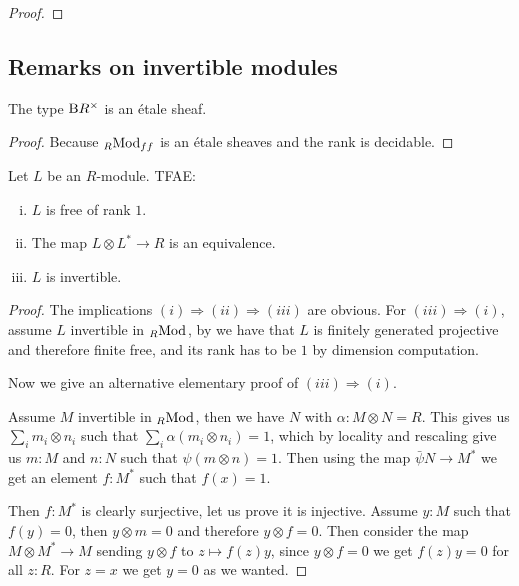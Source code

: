 \begin{proof}
\end{proof}



\subsection{Remarks on invertible modules}


\begin{lemma}
The type $\mathrm{B} R^\times$ is an \'etale sheaf.
\end{lemma}

\begin{proof}
Because ${}_{R}{\mathrm{Mod}}_{ff}$ is an \'etale sheaves and the rank is decidable.
\end{proof}

\begin{lemma}\label{invertible-R-module-free-rank-1}
Let $L$ be an $R$-module. TFAE:
\begin{enumerate}[(i)]
\item $L$ is free of rank $1$.
\item The map $L\otimes L^*\to R$ is an equivalence.
\item $L$ is invertible.
\end{enumerate}
\end{lemma}

\begin{proof}
The implications $(i)\Rightarrow (ii)\Rightarrow(iii)$ are obvious. For $(iii)\Rightarrow (i)$, assume $L$ invertible in ${}_{R}{\mathrm{Mod}}_{}$, by  we have that $L$ is finitely generated projective and therefore finite free, and its rank has to be $1$ by dimension computation. 

Now we give an alternative elementary proof of $(iii)\Rightarrow (i)$.

Assume $M$ invertible in ${}_{R}{\mathrm{Mod}}_{}$, then we have $N$ with $\alpha:M\otimes N = R$. This gives us $\sum_i m_i\otimes n_i$ such that $\sum_i \alpha(m_i\otimes n_i) = 1$, which by locality and rescaling give us $m:M$ and $n:N$ such that $\psi(m\otimes n) = 1$. Then using the map $\bar{\psi} N\to M^*$ we get an element $f:M^*$ such that $f(x) = 1$.

Then $f:M^*$ is clearly surjective, let us prove it is injective. Assume $y:M$ such that $f(y) = 0$, then $y\otimes m = 0$ and therefore $y\otimes f = 0$. Then consider the map $M\otimes M^*\to M$ sending $y\otimes f$ to $z\mapsto f(z)y$, since $y\otimes f = 0$ we get $f(z)y = 0$ for all $z:R$. For $z=x$ we get $y=0$ as we wanted.
\end{proof}

